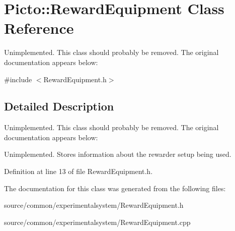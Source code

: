 \hypertarget{class_picto_1_1_reward_equipment}{\section{Picto\-:\-:Reward\-Equipment Class Reference}
\label{class_picto_1_1_reward_equipment}
}


Unimplemented. This class should probably be removed. The original documentation appears below\-:  




{\ttfamily \#include $<$Reward\-Equipment.\-h$>$}



\subsection{Detailed Description}
Unimplemented. This class should probably be removed. The original documentation appears below\-: 

Unimplemented. Stores information about the rewarder setup being used. 

Definition at line 13 of file Reward\-Equipment.\-h.



The documentation for this class was generated from the following files\-:\begin{DoxyCompactItemize}
\item 
source/common/experimentalsystem/Reward\-Equipment.\-h\item 
source/common/experimentalsystem/Reward\-Equipment.\-cpp\end{DoxyCompactItemize}
